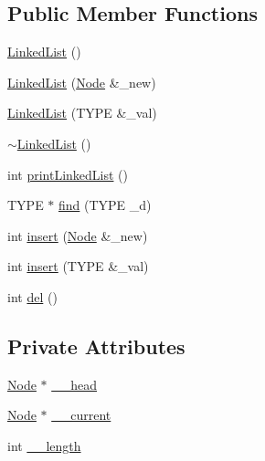 \subsection*{Public Member Functions}
\begin{DoxyCompactItemize}
\item 
\hyperlink{classCRAZYFISH_1_1LinkedList_a8cfb7db8375d42e804107bed6ee300d8}{Linked\+List} ()
\item 
\hyperlink{classCRAZYFISH_1_1LinkedList_a97ff37e22764e437dfeff71c686cfbd0}{Linked\+List} (\hyperlink{classCRAZYFISH_1_1LinkedList_1_1Node}{Node} \&\+\_\+new)
\item 
\hyperlink{classCRAZYFISH_1_1LinkedList_a5d084245dc02a983ba9645c80fc14cea}{Linked\+List} (T\+Y\+PE \&\+\_\+val)
\item 
\hyperlink{classCRAZYFISH_1_1LinkedList_a6e2311f3cc0ef21d731e0f17a005eca0}{$\sim$\+Linked\+List} ()
\item 
int \hyperlink{classCRAZYFISH_1_1LinkedList_aef8407ee5167b26ed5a5707fc2886fb8}{print\+Linked\+List} ()
\item 
T\+Y\+PE $\ast$ \hyperlink{classCRAZYFISH_1_1LinkedList_a9ec77e618ea899c8458824a2a10066de}{find} (T\+Y\+PE \+\_\+d)
\item 
int \hyperlink{classCRAZYFISH_1_1LinkedList_a114e00935149d4c6fb68cc4654a4904c}{insert} (\hyperlink{classCRAZYFISH_1_1LinkedList_1_1Node}{Node} \&\+\_\+new)
\item 
int \hyperlink{classCRAZYFISH_1_1LinkedList_a431acbe0a25d8e3d56994fcd427d21d7}{insert} (T\+Y\+PE \&\+\_\+val)
\item 
int \hyperlink{classCRAZYFISH_1_1LinkedList_aed4f2193935fb362eae3d47bb789edee}{del} ()
\end{DoxyCompactItemize}
\subsection*{Private Attributes}
\begin{DoxyCompactItemize}
\item 
\hyperlink{classCRAZYFISH_1_1LinkedList_1_1Node}{Node} $\ast$ \hyperlink{classCRAZYFISH_1_1LinkedList_a1439d0f5f10624ffd090cdec5430390d}{\+\_\+\+\_\+head}
\item 
\hyperlink{classCRAZYFISH_1_1LinkedList_1_1Node}{Node} $\ast$ \hyperlink{classCRAZYFISH_1_1LinkedList_aa964652536c838dbbe87900de5f8816e}{\+\_\+\+\_\+current}
\item 
int \hyperlink{classCRAZYFISH_1_1LinkedList_afe0f4aa3de15119600fd14c4a6ed3fc1}{\+\_\+\+\_\+length}
\end{DoxyCompactItemize}
